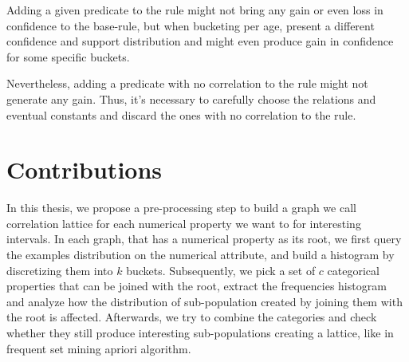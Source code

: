 \begin{figure}
\label{fig:addingHasChildExample}

\end{figure}

Adding a given predicate to the rule might not bring any gain or even loss in confidence to the base-rule, but when
bucketing per age, present a different confidence and support distribution and might even produce gain in confidence for
some specific buckets.

Nevertheless, adding a predicate with no correlation to the rule might not generate any gain. Thus, it's necessary to
carefully choose the relations and eventual constants and discard the ones with no correlation to the rule.  

\section{Contributions}
In this thesis, we propose a pre-processing step to build a graph we call correlation lattice for each numerical
property we want to for interesting intervals. In each graph, that has a numerical property as its root, we first
query the examples distribution on the numerical attribute, and build a histogram by discretizing them into $k$
buckets. Subsequently, we  pick a set of $c$ categorical properties that can be joined with the root, extract the
frequencies histogram and analyze how the distribution of sub-population created by joining them with the root is
affected. Afterwards, we try to combine the categories and check whether they still produce interesting sub-populations
creating a lattice, like in frequent set mining apriori algorithm.

